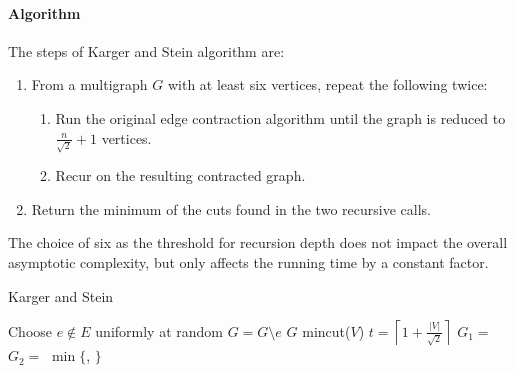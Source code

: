 \paragraph*{Algorithm}
The steps of Karger and Stein algorithm are: 
\begin{enumerate}
    \item From a multigraph $G$ with at least six vertices, repeat the following twice: 
        \begin{enumerate}
            \item Run the original edge contraction algorithm until the graph is reduced to $\frac{n}{\sqrt{2}}+1$ vertices.
            \item Recur on the resulting contracted graph.
        \end{enumerate}
    \item Return the minimum of the cuts found in the two recursive calls.
\end{enumerate}
The choice of six as the threshold for recursion depth does not impact the overall asymptotic complexity, but only affects the running time by a constant factor.
\begin{algorithm}[H]
    \caption{Karger and Stein}
    \begin{algorithmic}[1]
                \State Choose $e\notin E$ uniformly at random
                \State $G=G\setminus e$
            \EndWhile 
            \State \Return $G$
        \EndFunction
        \Statex
                \State \Return mincut($V$)
            \Else 
                \State $t= \left\lceil  1 + \frac{|V|}{\sqrt{2}}\right\rceil$
                \State $G_1 =$ 
                \State $G_2 =$ 
                \State \Return $\min \{$, $\}$
            \EndIf
        \EndFunction
    \end{algorithmic}
\end{algorithm}  

